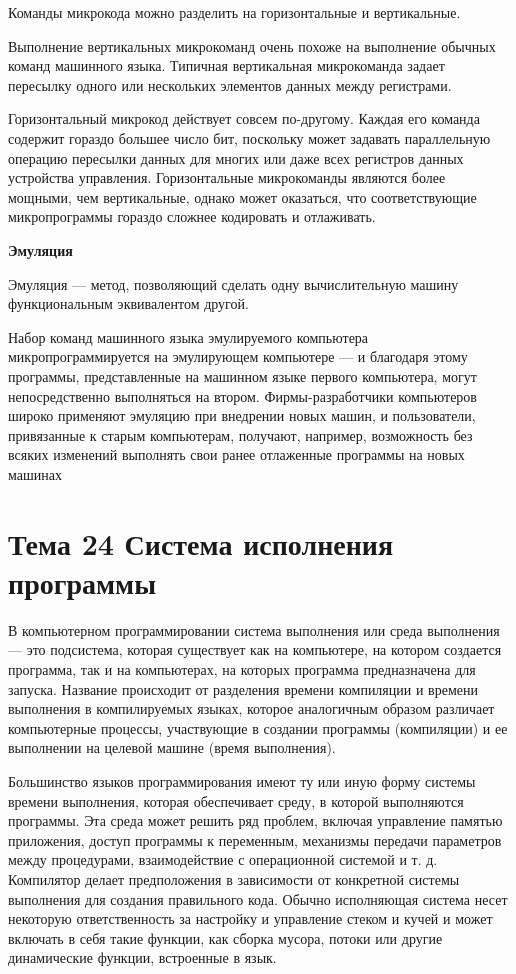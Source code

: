 Команды микрокода можно разделить на горизонтальные и вертикальные.

Выполнение вертикальных микрокоманд очень похоже на выполнение обычных команд машинного языка. Типичная вертикальная микрокоманда задает пересылку одного или нескольких элементов данных между регистрами.

Горизонтальный микрокод действует совсем по-другому. Каждая его команда содержит гораздо большее число бит, поскольку может задавать параллельную операцию пересылки данных для многих или даже всех регистров данных устройства управления. Горизонтальные микрокоманды являются более мощными, чем вертикальные, однако может оказаться, что соответствующие микропрограммы гораздо сложнее кодировать и отлаживать.

\begin{center}{\bfseries Эмуляция}
\end{center} 

\begin{opr}
  Эмуляция — метод, позволяющий сделать одну вычислительную машину функциональным эквивалентом другой.
\end{opr}

Набор команд машинного языка эмулируемого компьютера микропрограммируется на эмулирующем компьютере — и благодаря этому программы, представленные на машинном языке первого компьютера, могут непосредственно выполняться на втором. Фирмы-разработчики компьютеров широко применяют эмуляцию при внедрении новых машин, и пользователи, привязанные к старым компьютерам, получают, например, возможность без всяких изменений выполнять свои ранее отлаженные программы на новых машинах

\newpage 
\chapter{Тема 24 Система исполнения программы}

В компьютерном программировании система выполнения или среда выполнения — это подсистема, которая существует как на компьютере, на котором создается программа, так и на компьютерах, на которых программа предназначена для запуска. Название происходит от разделения времени компиляции и времени выполнения в компилируемых языках, которое аналогичным образом различает компьютерные процессы, участвующие в создании программы (компиляции) и ее выполнении на целевой машине (время выполнения). 

Большинство языков программирования имеют ту или иную форму системы времени выполнения, которая обеспечивает среду, в которой выполняются программы. Эта среда может решить ряд проблем, включая управление памятью приложения, доступ программы к переменным, механизмы передачи параметров между процедурами, взаимодействие с операционной системой и т. д. Компилятор делает предположения в зависимости от конкретной системы выполнения для создания правильного кода. Обычно исполняющая система несет некоторую ответственность за настройку и управление стеком и кучей и может включать в себя такие функции, как сборка мусора, потоки или другие динамические функции, встроенные в язык.

